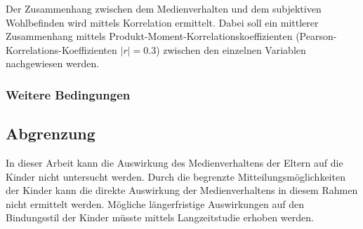 Der Zusammenhang zwischen dem Medienverhalten und dem subjektiven Wohlbefinden wird mittels Korrelation ermittelt. Dabei soll ein mittlerer Zusammenhang mittels Produkt-Moment-Korrelationskoeffizienten (Pearson-Korrelations-Koeffizienten $|r|=0.3$) zwischen den einzelnen Variablen nachgewiesen werden.

  
\subsubsection{Weitere Bedingungen}
\subsection{Abgrenzung}
In dieser Arbeit kann die Auswirkung des Medienverhaltens der Eltern auf die Kinder nicht untersucht werden. Durch die begrenzte Mitteilungsmöglichkeiten der Kinder kann die direkte Auswirkung der Medienverhaltens in diesem Rahmen nicht ermittelt werden. Mögliche längerfristige Auswirkungen auf den Bindungsstil der Kinder müsste mittels Langzeitstudie erhoben werden. 
